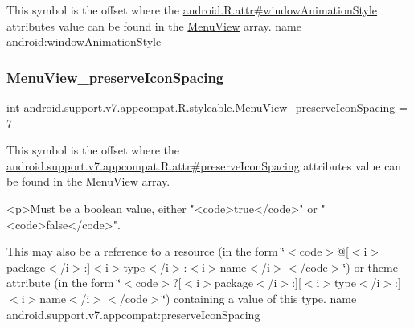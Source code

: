 This symbol is the offset where the \hyperlink{}{android.\+R.\+attr\#window\+Animation\+Style} attribute\textquotesingle{}s value can be found in the \hyperlink{classandroid_1_1support_1_1v7_1_1appcompat_1_1R_1_1styleable_ab45f4f3fe3b636a3730a9fb26bfa1050}{Menu\+View} array.  name android\+:window\+Animation\+Style \mbox{\label{classandroid_1_1support_1_1v7_1_1appcompat_1_1R_1_1styleable_a8b0fb09a515b636405db851879e9fb7d}} 
\subsubsection{\texorpdfstring{Menu\+View\+\_\+preserve\+Icon\+Spacing}{MenuView\_preserveIconSpacing}}
{\footnotesize\ttfamily int android.\+support.\+v7.\+appcompat.\+R.\+styleable.\+Menu\+View\+\_\+preserve\+Icon\+Spacing = 7\hspace{0.3cm}{\ttfamily [static]}}

This symbol is the offset where the \hyperlink{classandroid_1_1support_1_1v7_1_1appcompat_1_1R_1_1attr_abe233b217b211968e10d98d011e83813}{android.\+support.\+v7.\+appcompat.\+R.\+attr\#preserve\+Icon\+Spacing} attribute\textquotesingle{}s value can be found in the \hyperlink{classandroid_1_1support_1_1v7_1_1appcompat_1_1R_1_1styleable_ab45f4f3fe3b636a3730a9fb26bfa1050}{Menu\+View} array.

\begin{DoxyVerb}      <p>Must be a boolean value, either "<code>true</code>" or "<code>false</code>".
\end{DoxyVerb}
 

This may also be a reference to a resource (in the form \char`\"{}$<$code$>$@\mbox{[}$<$i$>$package$<$/i$>$\+:\mbox{]}$<$i$>$type$<$/i$>$\+:$<$i$>$name$<$/i$>$$<$/code$>$\char`\"{}) or theme attribute (in the form \char`\"{}$<$code$>$?\mbox{[}$<$i$>$package$<$/i$>$\+:\mbox{]}\mbox{[}$<$i$>$type$<$/i$>$\+:\mbox{]}$<$i$>$name$<$/i$>$$<$/code$>$\char`\"{}) containing a value of this type.  name android.\+support.\+v7.\+appcompat\+:preserve\+Icon\+Spacing \mbox{\label{classandroid_1_1support_1_1v7_1_1appcompat_1_1R_1_1styleable_a52cfb3ba7bdfc8fb2cca459f35c24456}} 
